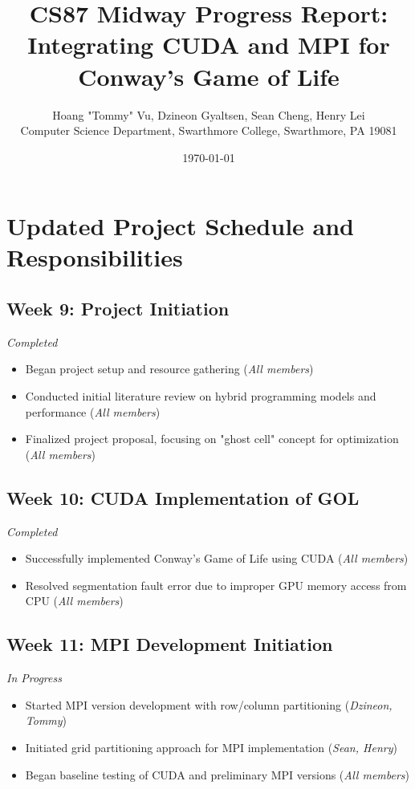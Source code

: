 \documentclass[11pt]{article}
\begin{document}
\title{CS87 Midway Progress Report: Integrating CUDA and MPI for Conway's Game of Life}
\author{Hoang "Tommy" Vu, Dzineon Gyaltsen, Sean Cheng, Henry Lei \\
Computer Science Department, Swarthmore College, Swarthmore, PA  19081}
\date{\today}

\maketitle

\section{Updated Project Schedule and Responsibilities}

\subsection*{Week 9: Project Initiation} 
\textit{Completed}
\begin{itemize}
    \item Began project setup and resource gathering (\textit{All members})
    \item Conducted initial literature review on hybrid programming models and performance (\textit{All members})
    \item Finalized project proposal, focusing on "ghost cell" concept for optimization (\textit{All members})
\end{itemize}

\subsection*{Week 10: CUDA Implementation of GOL} 
\textit{Completed}
\begin{itemize}
    \item Successfully implemented Conway's Game of Life using CUDA (\textit{All members})
    \item Resolved segmentation fault error due to improper GPU memory access from CPU (\textit{All members})
\end{itemize}

\subsection*{Week 11: MPI Development Initiation} 
\textit{In Progress}
\begin{itemize}
    \item Started MPI version development with row/column partitioning (\textit{Dzineon, Tommy})
    \item Initiated grid partitioning approach for MPI implementation (\textit{Sean, Henry})
    \item Began baseline testing of CUDA and preliminary MPI versions (\textit{All members})
\end{itemize}
\end{document}
